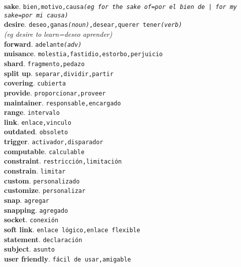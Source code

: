 \documentclass[twocolumn]{article}
\begin{document}
	\textsf{\textbf{sake}}. \texttt{bien,motivo,causa{\scriptsize \textsl{(eg for the sake of=por el bien de | for my sake=por mi causa)}}}\\
	\textsf{\textbf{desire}}. \texttt{deseo,ganas{\scriptsize \textsl{(noun)}},desear,querer tener{\scriptsize \textsl{(verb)}}}\\{\scriptsize \textsl{(eg desire to learn=deseo aprender)}}\\
	\textsf{\textbf{forward}}. \texttt{adelante{\scriptsize \textsl{(adv)}}}\\
	\textsf{\textbf{nuisance}}. \texttt{molestia,fastidio,estorbo,perjuicio}\\
	\textsf{\textbf{shard}}. \texttt{fragmento,pedazo}\\
	\textsf{\textbf{split up}}. \texttt{separar,dividir,partir}\\
	\textsf{\textbf{covering}}. \texttt{cubierta}\\
	\textsf{\textbf{provide}}. \texttt{proporcionar,proveer}\\
	\textsf{\textbf{maintainer}}. \texttt{responsable,encargado}\\
	\textsf{\textbf{range}}. \texttt{intervalo}\\
	\textsf{\textbf{link}}. \texttt{enlace,vinculo}\\
	\textsf{\textbf{outdated}}. \texttt{obsoleto}\\
	\textsf{\textbf{trigger}}. \texttt{activador,disparador}\\
	\textsf{\textbf{computable}}. \texttt{calculable}\\
	\textsf{\textbf{constraint}}. \texttt{restricci\'on,limitaci\'on}\\
	\textsf{\textbf{constrain}}. \texttt{limitar}\\
	\textsf{\textbf{custom}}. \texttt{personalizado}\\
	\textsf{\textbf{customize}}. \texttt{personalizar}\\
	\textsf{\textbf{snap}}. \texttt{agregar}\\
	\textsf{\textbf{snapping}}. \texttt{agregado}\\
	\textsf{\textbf{socket}}. \texttt{conexi\'on}\\
	\textsf{\textbf{soft link}}. \texttt{enlace l\'ogico,enlace flexible}\\
	\textsf{\textbf{statement}}. \texttt{declaraci\'on}\\
	\textsf{\textbf{subject}}. \texttt{asunto}\\
	\textsf{\textbf{user friendly}}. \texttt{f\'acil de usar,amigable}\\
\end{document}
